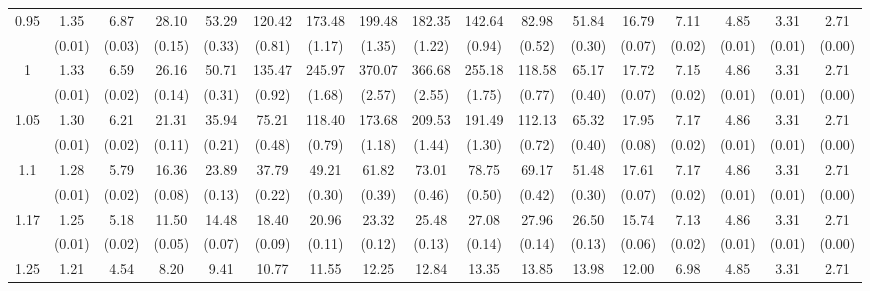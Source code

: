\documentclass[12pt]{article}  %
\theoremstyle{plain}
\begin{document}
\begin{sidewaystable}[htbp]
\begin{tabular}{ccccccccccccccccc}
\multirow{2}{*}{0.95}  & 1.35& 6.87 &28.10& 53.29 &120.42 &173.48& 199.48 &182.35& 142.64 & 82.98 &51.84 &16.79 & 7.11 & 4.85 & 3.31 & 2.71\\
                      & (0.01)& (0.03)& (0.15)& (0.33)& (0.81)& (1.17)& (1.35)& (1.22)& (0.94)&  (0.52)&  (0.30)&  (0.07)&  (0.02)&  (0.01)&  (0.01)&    (0.00)\\ \hline
\multirow{2}{*}{1}  & 1.33& 6.59& 26.16 &50.71 &135.47& 245.97& 370.07& 366.68& 255.18& 118.58& 65.17& 17.72 & 7.15 & 4.86 & 3.31&  2.71\\
                      & (0.01)& (0.02)& (0.14)& (0.31)& (0.92)& (1.68)& (2.57)& (2.55)& (1.75)&  (0.77)&  (0.40)&  (0.07)&  (0.02)&  (0.01)&  (0.01) &     (0.00)\\ \hline                                                                     
\multirow{2}{*}{1.05}  &1.30& 6.21 &21.31& 35.94 & 75.21 &118.40& 173.68& 209.53& 191.49 &112.13& 65.32& 17.95 & 7.17 & 4.86 & 3.31&  2.71\\
                      & (0.01)& (0.02)& (0.11)& (0.21)& (0.48)& (0.79)& (1.18)& (1.44)& (1.30)&  (0.72)&  (0.40)&  (0.08)&  (0.02)&  (0.01)&  (0.01) &     (0.00)\\ \hline                                                                                                                                          
\multirow{2}{*}{1.1}  &1.28& 5.79 &16.36& 23.89 & 37.79 & 49.21 & 61.82 & 73.01 & 78.75 & 69.17& 51.48& 17.61 & 7.17 & 4.86 & 3.31 & 2.71\\
                      &  (0.01)& (0.02)& (0.08)& (0.13)& (0.22)& (0.30)& (0.39)& (0.46)& (0.50)&  (0.42)&  (0.30)&  (0.07)&  (0.02)&  (0.01)&  (0.01) &     (0.00)\\ \hline
\multirow{2}{*}{1.17}  &1.25& 5.18& 11.50 &14.48 & 18.40 & 20.96 & 23.32 & 25.48 & 27.08 & 27.96& 26.50& 15.74 & 7.13 & 4.86 & 3.31 & 2.71\\
                      & (0.01) &(0.02)& (0.05)& (0.07)& (0.09)& (0.11)& (0.12)& (0.13)& (0.14)&  (0.14)&  (0.13)&  (0.06)&  (0.02)&  (0.01)&  (0.01) &   (0.00)\\ \hline                                                                                                                                                                                                                                                                                    
                                                                     \multirow{2}{*}{1.25}  &1.21& 4.54 & 8.20 & 9.41 & 10.77 & 11.55 & 12.25 & 12.84 & 13.35 & 13.85 &13.98& 12.00 & 6.98 & 4.85 & 3.31 & 2.71\\

\end{tabular}
\end{sidewaystable}
\end{document}
